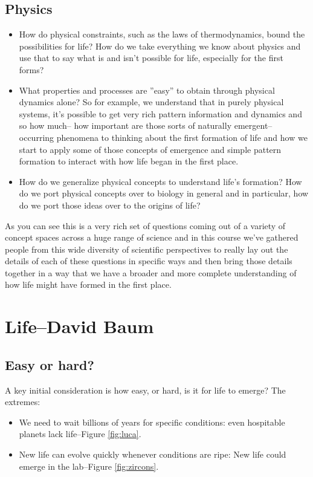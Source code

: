 \documentclass[]{article}
\begin{document}
	
\subsection{Physics}

\begin{itemize}
	\item How do physical constraints, such as the laws of thermodynamics, bound the possibilities for life? How do we take everything we know about physics and use that to say what is and 	isn't possible for life, especially for the	first forms?
	\item What properties and processes are ''easy'' to obtain through physical dynamics alone?	So for example, we understand that in 	purely physical systems, it's possible to get very rich pattern information and 	dynamics and so how much-- how important 	are those sorts of naturally emergent--	occurring phenomena to thinking about the first formation of life and how we start 	to apply some of those concepts of 	emergence and simple pattern formation to 	interact with
	how life began in the first place.
	\item How do we generalize physical concepts to understand life’s formation? How do we port physical concepts over 	to biology in general and in particular, how do we port those ideas over to the origins of life?
\end{itemize}	

As you can see this is a very rich set of questions coming out of a variety of concept spaces across a huge range of science and in this course we've gathered people from this wide diversity of scientific perspectives to really lay out the details of each of these questions in specific ways and then bring those details together in a way that we have a broader and more complete understanding of how life might have formed in the first place.


\section[Life]{Life--David Baum}

\subsection{Easy or hard?}
A key initial consideration is how easy, or hard, is it for life to emerge?
The extremes:
\begin{itemize}
	\item We need to wait billions of years for specific conditions: even hospitable planets lack life--Figure \ref{fig:luca}.
	\item New life can evolve quickly whenever conditions are ripe:  New life could emerge in the lab--Figure \ref{fig:zircons}.
\end{itemize}
\end{document}
